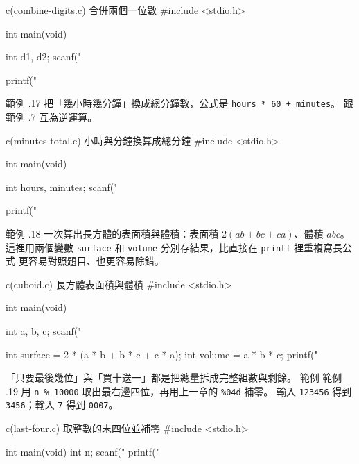 \begin{example}{c}{(combine-digits.c) 合併兩個一位數}
#include <stdio.h>

int main(void) {
    int d1, d2;
    scanf("%

    printf("%
}
\end{example}


範例 \thechapter.17 把「幾小時幾分鐘」換成總分鐘數，公式是
\texttt{hours * 60 + minutes}。 跟範例 \thechapter.7 互為逆運算。

\begin{example}{c}{(minutes-total.c) 小時與分鐘換算成總分鐘}
#include <stdio.h>

int main(void) {
    int hours, minutes;
    scanf("%

    printf("%
}
\end{example}


範例 \thechapter.18 一次算出長方體的表面積與體積：表面積
$2(ab + bc + ca)$、體積 $abc$。 這裡用兩個變數 \texttt{surface} 和
\texttt{volume} 分別存結果，比直接在 \texttt{printf} 裡重複寫長公式
更容易對照題目、也更容易除錯。

\begin{example}{c}{(cuboid.c) 長方體表面積與體積}
#include <stdio.h>

int main(void) {
    int a, b, c;
    scanf("%

    int surface = 2 * (a * b + b * c + c * a);
    int volume = a * b * c;
    printf("%
}
\end{example}


「只要最後幾位」與「買十送一」都是把總量拆成完整組數與剩餘。 範例
範例 \thechapter.19 用 \texttt{n \% 10000} 取出最右邊四位，再用上一章的
\texttt{\%04d} 補零。 輸入 \texttt{123456} 得到 \texttt{3456}；輸入
\texttt{7} 得到 \texttt{0007}。

\begin{example}{c}{(last-four.c) 取整數的末四位並補零}
#include <stdio.h>

int main(void) {
    int n;
    scanf("%
    printf("%
}
\end{example}

